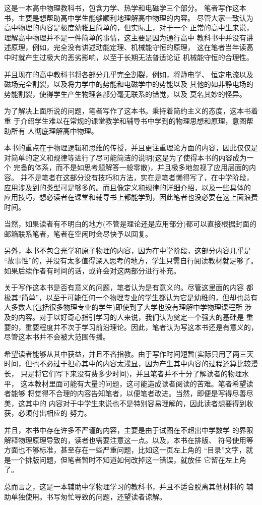 这是一本高中物理教科书，包含力学、热学和电磁学三个部分。
笔者写作这本书，主要是想帮助高中学生能够顺利地理解高中物理的内容。
尽管大家一致认为高中物理的内容是极度幼稚且简单的，但实际上，对于一个
正常的高中生来说，理解高中物理并不是一件简单的事情，这主要是因为通行高中
教科书中并没有讲述原理，例如，完全没有讲述动能定理、机械能守恒的原理，
这在笔者当年读高中时就产生过极大的恶劣影响，以至于长期无法普适论证
机械能守恒的合理性。

并且现在的高中教科书将各部分几乎完全割裂，例如，将静电学、
恒定电流以及磁场完全割裂，以及将力学中的势能和电磁学中的势能以及
其他的如非静电场的势能割裂，使得学生产生物理各部分毫无联系的错觉，以及
莫名其妙的怪异。

为了解决上面所说的问题，笔者写作了这本书。秉持着简约主义的态度，这本书着重
于介绍学生难以在常规的课堂教学和辅导书中学到的物理思想和原理，意图帮助所有
人彻底理解高中物理。

本书的重点在于物理逻辑和思维的传授，并且更注重理论方面的内容，因此仅仅是
对简单的定义和规律等进行了尽可能简洁的说明(这是为了使得本书的内容成为一个
完备的体系，而不是如思考题解答一般零散)，并且极多地忽视了应用层面的内容。
并不是笔者在这部分没有技巧和方法，实在是笔者懒得写了，在中学阶段，
应用涉及到的类型可是够多的。而且像定义和规律的详细介绍，以及一些具体的
应用技巧，想必读者在课堂和辅导书上都能学到，因此笔者也没必要在这上面浪费时间。

当然，如果读者有不明白的地方(不管是理论还是应用部分)都可以直接根据封面的
邮箱联系笔者，笔者在空闲时会尽快予以回复。

另外，本书不包含光学和原子物理的内容，因为在中学阶段，这部分内容几乎是
“故事性”的，并没有太多值得深入思考的地方，学生只需自行阅读教材就足够了。
如果后续作者有时间的话，或许会对这两部分进行补充。

关于写作这本书是否有意义的问题，笔者认为是有意义的。尽管这里面的内容
都极其“简单”，以至于可能任何一个物理专业的学生都认为它是幼稚的，但却也总有
大多数人(包括很多物理专业的学生)即使到了大学也没有理解中学物理课程所
涉及的内容。对于以好奇心指引学习的人来说，我们认为奠定一个强大的基础是
重要的，重要程度并不次于学习前沿理论。因此，笔者认为写这本书还是有意义的，
尽管这本书并不会被大范围传播。

希望读者能够从其中获益，并且不吝指教。由于写作时间短暂(实际只用了两三天
时间，但也不必过于担心其中的内容太浅显，因为产生其中内容的过程还算比较漫长，
只是将它们写下来没有费多少时间)，并且笔者并不十分了解读者的物理水平，
这本教材里面可能有大量的问题，这可能造成读者阅读的苦难。笔者希望读者能够
将觉得不合理的内容告知笔者，以便笔者改进。当然，即便是写得尽善尽美，这其中的
内容对于中学生来说也不是特别容易理解的，因此读者想要得到收获，必须付出相应的
努力。

并且，本书中存在许多不严谨的内容，主要是由于试图在不超出中学数学
的界限解释物理原理导致的，读者也需要注意这一点。以及，本书在排版、
符号使用等方面也不够标准，甚至存在一些严重问题，比如这一页左上角的
“目录”文字，就是一个排版问题，但笔者暂时不知道如何改掉这一错误，就放任
它留在左上角了。

总而言之，这是一本辅助中学物理学习的教科书，并且不适合脱离其他材料的
辅助单独使用。书写匆忙导致的问题，还望读者谅解。